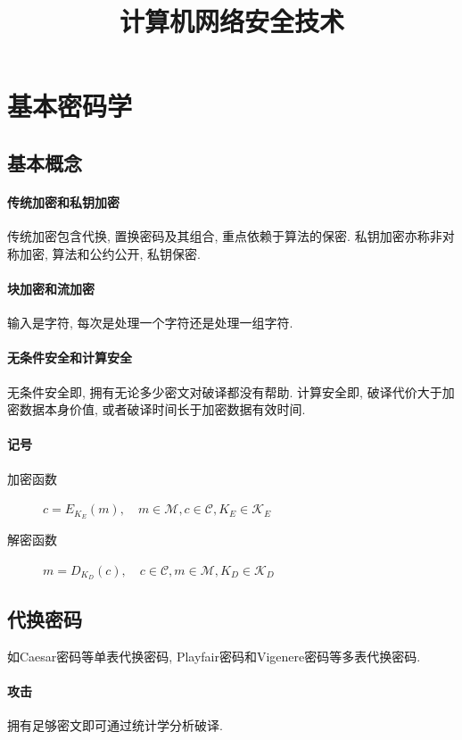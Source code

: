 \documentclass{ctexart}
\title{计算机网络安全技术}
\begin{document}
\maketitle

\tableofcontents

\section{基本密码学}
\subsection{基本概念}
\paragraph{传统加密和私钥加密} 传统加密包含代换, 置换密码及其组合, 重点依赖于算法的保密.
    私钥加密亦称非对称加密, 算法和公约公开, 私钥保密.
\paragraph{块加密和流加密} 输入是字符, 每次是处理一个字符还是处理一组字符.
\paragraph{无条件安全和计算安全} 无条件安全即, 拥有无论多少密文对破译都没有帮助.
    计算安全即, 破译代价大于加密数据本身价值, 或者破译时间长于加密数据有效时间.
\paragraph{记号}
    \begin{description}
        \item[加密函数] $c = E_{K_E}(m),\quad m \in \mathcal{M}, c \in \mathcal{C}, K_E \in \mathcal{K}_E$
        \item[解密函数] $m = D_{K_D}(c),\quad c \in \mathcal{C}, m \in \mathcal{M}, K_D \in \mathcal{K}_D$
    \end{description}

\subsection{代换密码}
    如Caesar密码等单表代换密码, Playfair密码和Vigenere密码等多表代换密码.
\paragraph{攻击} 拥有足够密文即可通过统计学分析破译.
\end{document}
